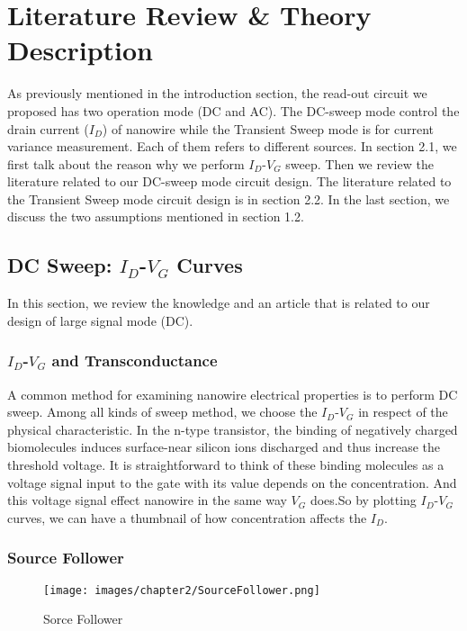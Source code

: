 \chapter{Literature Review \& Theory Description}
As previously mentioned in the introduction section, the read-out circuit we proposed has two operation mode (DC and AC).
The DC-sweep mode control the drain current ($I_D$) of nanowire while the Transient Sweep mode is for current variance measurement.
Each of them refers to different sources.
In section 2.1, we first talk about the reason why we perform $I_D$-$V_G$ sweep.
Then we review the literature related to our DC-sweep mode circuit design.
The literature related to the Transient Sweep mode circuit design is in section 2.2.
In the last section, we discuss the two assumptions mentioned in section 1.2.

\section{DC Sweep: $I_D$-$V_G$ Curves}
In this section, we review the knowledge and an article that is related to our design of large signal mode (DC).

\subsection{$I_D$-$V_G$ and Transconductance}
A common method for examining nanowire electrical properties is to perform DC sweep.
Among all kinds of sweep method, we choose the $I_D$-$V_G$ in respect of the physical characteristic.
In the n-type transistor, the binding of negatively charged biomolecules induces surface-near silicon ions discharged and thus increase the threshold voltage.
It is straightforward to think of these binding molecules as a voltage signal input to the gate with its value depends on the concentration.
And this voltage signal effect nanowire in the same way $V_G$ does.So by plotting $I_D$-$V_G$  curves, we can have a thumbnail of how concentration affects the $I_D$.


\subsection{Source Follower} \label{section:SF}

\begin{figure}[h]
    \centering
    \texttt{[image: images/chapter2/SourceFollower.png]}
    \fontsize{6}{7}\selectfont
    \caption{Sorce Follower}
    \label{fig:SF}
\end{figure}

